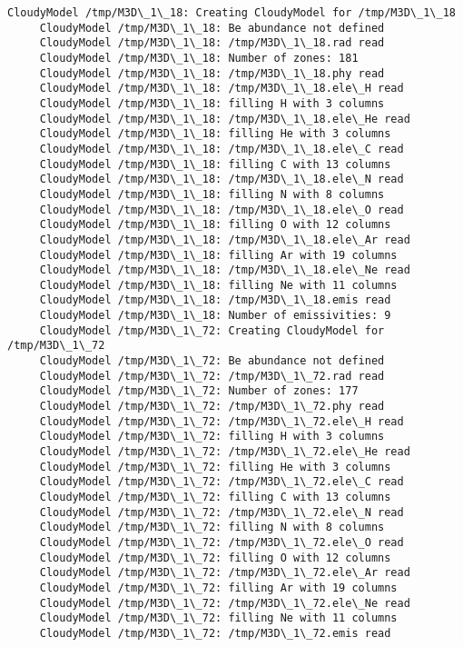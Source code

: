 \documentclass[11pt]{article}
\begin{document}
    \begin{Verbatim}[commandchars=\\\{\}]
     CloudyModel /tmp/M3D\_1\_18: Creating CloudyModel for /tmp/M3D\_1\_18
     CloudyModel /tmp/M3D\_1\_18: Be abundance not defined
     CloudyModel /tmp/M3D\_1\_18: /tmp/M3D\_1\_18.rad read
     CloudyModel /tmp/M3D\_1\_18: Number of zones: 181
     CloudyModel /tmp/M3D\_1\_18: /tmp/M3D\_1\_18.phy read
     CloudyModel /tmp/M3D\_1\_18: /tmp/M3D\_1\_18.ele\_H read
     CloudyModel /tmp/M3D\_1\_18: filling H with 3 columns
     CloudyModel /tmp/M3D\_1\_18: /tmp/M3D\_1\_18.ele\_He read
     CloudyModel /tmp/M3D\_1\_18: filling He with 3 columns
     CloudyModel /tmp/M3D\_1\_18: /tmp/M3D\_1\_18.ele\_C read
     CloudyModel /tmp/M3D\_1\_18: filling C with 13 columns
     CloudyModel /tmp/M3D\_1\_18: /tmp/M3D\_1\_18.ele\_N read
     CloudyModel /tmp/M3D\_1\_18: filling N with 8 columns
     CloudyModel /tmp/M3D\_1\_18: /tmp/M3D\_1\_18.ele\_O read
     CloudyModel /tmp/M3D\_1\_18: filling O with 12 columns
     CloudyModel /tmp/M3D\_1\_18: /tmp/M3D\_1\_18.ele\_Ar read
     CloudyModel /tmp/M3D\_1\_18: filling Ar with 19 columns
     CloudyModel /tmp/M3D\_1\_18: /tmp/M3D\_1\_18.ele\_Ne read
     CloudyModel /tmp/M3D\_1\_18: filling Ne with 11 columns
     CloudyModel /tmp/M3D\_1\_18: /tmp/M3D\_1\_18.emis read
     CloudyModel /tmp/M3D\_1\_18: Number of emissivities: 9
     CloudyModel /tmp/M3D\_1\_72: Creating CloudyModel for /tmp/M3D\_1\_72
     CloudyModel /tmp/M3D\_1\_72: Be abundance not defined
     CloudyModel /tmp/M3D\_1\_72: /tmp/M3D\_1\_72.rad read
     CloudyModel /tmp/M3D\_1\_72: Number of zones: 177
     CloudyModel /tmp/M3D\_1\_72: /tmp/M3D\_1\_72.phy read
     CloudyModel /tmp/M3D\_1\_72: /tmp/M3D\_1\_72.ele\_H read
     CloudyModel /tmp/M3D\_1\_72: filling H with 3 columns
     CloudyModel /tmp/M3D\_1\_72: /tmp/M3D\_1\_72.ele\_He read
     CloudyModel /tmp/M3D\_1\_72: filling He with 3 columns
     CloudyModel /tmp/M3D\_1\_72: /tmp/M3D\_1\_72.ele\_C read
     CloudyModel /tmp/M3D\_1\_72: filling C with 13 columns
     CloudyModel /tmp/M3D\_1\_72: /tmp/M3D\_1\_72.ele\_N read
     CloudyModel /tmp/M3D\_1\_72: filling N with 8 columns
     CloudyModel /tmp/M3D\_1\_72: /tmp/M3D\_1\_72.ele\_O read
     CloudyModel /tmp/M3D\_1\_72: filling O with 12 columns
     CloudyModel /tmp/M3D\_1\_72: /tmp/M3D\_1\_72.ele\_Ar read
     CloudyModel /tmp/M3D\_1\_72: filling Ar with 19 columns
     CloudyModel /tmp/M3D\_1\_72: /tmp/M3D\_1\_72.ele\_Ne read
     CloudyModel /tmp/M3D\_1\_72: filling Ne with 11 columns
     CloudyModel /tmp/M3D\_1\_72: /tmp/M3D\_1\_72.emis read

\end{Verbatim}
\end{document}
